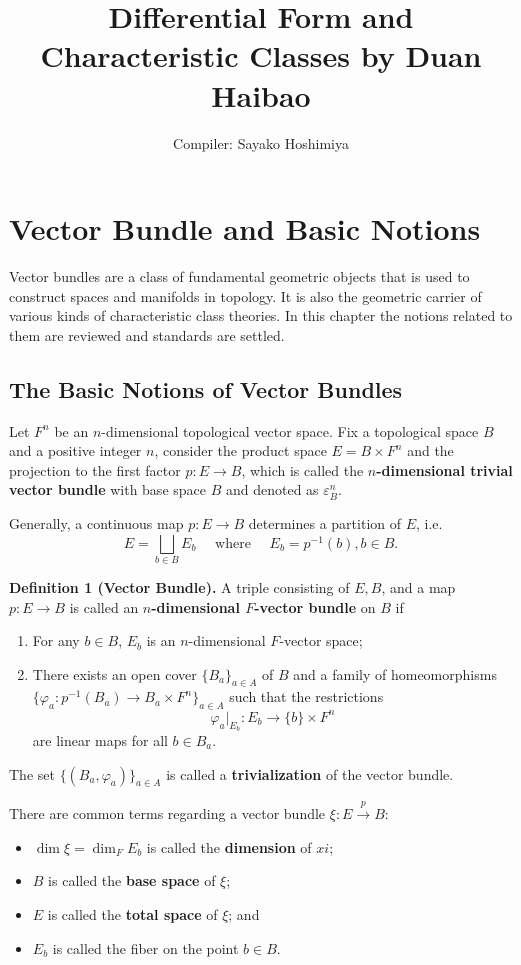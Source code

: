 \documentclass[10pt]{article}
\title{Differential Form and Characteristic Classes by Duan Haibao}
\author{Compiler: Sayako Hoshimiya}
\begin{document}
\maketitle
\renewcommand{\setminus}{\mathbin{\backslash}}

\section{Vector Bundle and Basic Notions}
Vector bundles are a class of fundamental geometric objects that is used to construct spaces and manifolds in topology. It is also the geometric carrier of various kinds of characteristic class theories. In this chapter the notions related to them are reviewed and standards are settled.

\subsection{The Basic Notions of Vector Bundles}
Let $F^n$ be an $n$-dimensional topological vector space. Fix a topological space $B$ and a positive integer $n$, consider the product space $E=B\times F^n$ and the projection to the first factor $p:E\to B$, which is called the \textbf{$n$-dimensional trivial vector bundle} with base space $B$ and denoted as $\varepsilon_B^n$.

Generally, a continuous map $p:E\to B$ determines a partition of $E$, i.e. $$E=\bigsqcup_{b\in B}E_b\quad\text{ where }\quad E_b=p^{-1}(b),b\in B.$$

\textbf{Definition 1 (Vector Bundle).} A triple consisting of $E,B$, and a map $p:E\to B$ is called an \textbf{$n$-dimensional $F$-vector bundle} on $B$ if \begin{enumerate}\item For any $b\in B$, $E_b$ is an $n$-dimensional $F$-vector space;\item There exists an open cover $\{B_a\}_{a\in A}$ of $B$ and a family of homeomorphisms $\{\varphi_a:p^{-1}(B_a)\to B_a\times F^n\}_{a\in A}$ such that the restrictions $$\varphi_a\big|_{E_b}:E_b\to\{b\}\times F^n$$ are linear maps for all $b\in B_a$.\end{enumerate} The set $\{(B_a,\varphi_a)\}_{a\in A}$ is called a \textbf{trivialization} of the vector bundle.

There are common terms regarding a vector bundle $\xi:E\overset{p}{\to}B$:\begin{itemize}\item $\dim\xi=\dim_FE_b$ is called the \textbf{dimension} of $xi$;\item $B$ is called the \textbf{base space} of $\xi$;\item $E$ is called the \textbf{total space} of $\xi$; and\item $E_b$ is called the fiber on the point $b\in B$.\end{itemize}
\end{document}
